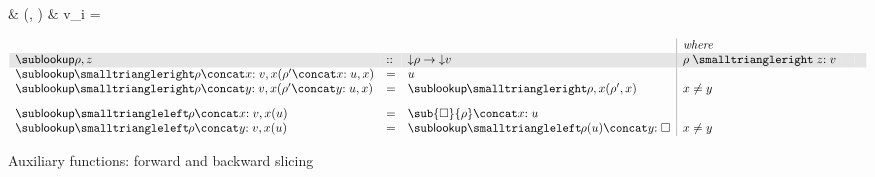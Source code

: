 \begin{figure}[H]

\flushleft {}

\vspace{5pt}
\flushleft{}
\begin{salign}
   &\closeDefsBwdR
   (\bigjoin\vec{\rho},  )
   &
   v_i = 
\end{salign}

\small
$\begin{array}{lll|llll}
\arrayrulecolor{lightgray}
&&&\textit{where}
\\
\rowcolor{verylightgray}
\envLookupGC{\rho,z} &::& \Below{\rho} \to \Below{v}
&\envLookup{\rho}{z}{v}
&&
\\
\envLookupFwdF{\rho \concat \bind{x}{v},x}(\rho' \concat \bind{x}{u},x) &=& u
\\
\envLookupFwdF{\rho \concat \bind{y}{v},x}(\rho' \concat \bind{y}{u},x)
&=&
\envLookupFwdF{\rho,x}(\rho',x)
&
x \neq y
\\[3mm]
\envLookupBwdF{\rho \concat \bind{x}{v},x}(u)
&=&
\sub{\hole}{\rho} \concat \bind{x}{u}
\\
\envLookupBwdF{\rho \concat \bind{y}{v},x}(u)
&=&
\envLookupBwdF{\rho}(u) \concat \bind{y}{\hole}
&
x \neq y
\end{array}$
\caption{Auxiliary functions: forward and backward slicing}
\label{fig:slicing:eval-aux}
\end{figure}
